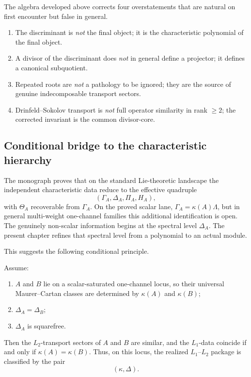 The algebra developed above corrects four overstatements that are natural on first encounter but false in general.

\begin{enumerate}[label=\textup{(\arabic*)}]
\item The discriminant is \emph{not} the final object; it is the characteristic polynomial of the final object.

\item A divisor of the discriminant does \emph{not} in general define a projector; it defines a canonical subquotient.

\item Repeated roots are \emph{not} a pathology to be ignored; they are the source of genuine indecomposable transport sectors.

\item Drinfeld--Sokolov transport is \emph{not} full operator similarity in rank \(\ge 2\); the corrected invariant is the common divisor-core.
\end{enumerate}

\subsection{Conditional bridge to the characteristic hierarchy}

The monograph proves that on the standard Lie-theoretic landscape the independent characteristic data reduce to the effective quadruple
\[
(\Gamma_A,\Delta_A,\Pi_A,H_A),
\]
with \(\Theta_A\) recoverable from \(\Gamma_A\).  On the proved scalar lane,
\(\Gamma_A = \kappa(A)\Lambda\), but in general multi-weight
one-channel families this additional identification is open.  The genuinely
non-scalar information begins at the spectral level \(\Delta_A\).
The present chapter refines that spectral level from a polynomial to an actual module.

This suggests the following conditional principle.

\begin{proposition}
\ClaimStatusProvedHere
Assume:
\begin{enumerate}[label=\textup{(\roman*)}]
\item \(A\) and \(B\) lie on a scalar-saturated one-channel locus, so their universal Maurer--Cartan classes are determined by \(\kappa(A)\) and \(\kappa(B)\);
\item \(\Delta_A=\Delta_B\);
\item \(\Delta_A\) is squarefree.
\end{enumerate}
Then the \(L_2\)-transport sectors of \(A\) and \(B\) are similar, and the \(L_1\)-data coincide if and only if \(\kappa(A)=\kappa(B)\).
Thus, on this locus, the realized \(L_1\)--\(L_2\) package is classified by the pair
\[
(\kappa,\Delta).
\]
\end{proposition}

